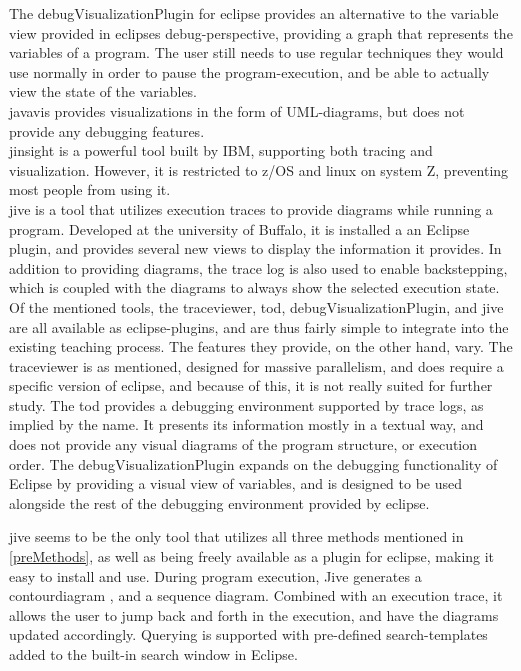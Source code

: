 The \gls{debugVisualizationPlugin} for eclipse provides an alternative to the variable view provided in eclipses debug-perspective, providing a graph that represents the variables of a program.
The user still needs to use regular techniques they would use normally in order to pause the program-execution, and be able to actually view the state of the variables.
~\\

\Gls{javavis} \cite{Oechsle2002} provides visualizations in the form of UML-diagrams, but does not provide any debugging features.
~\\

\Gls{jinsight} \cite{Pauw} is a powerful tool built by IBM, supporting both tracing and visualization.
However, it is restricted to z/OS and linux on system Z, preventing most people from using it.
~\\

\Gls{jive} is a tool that utilizes execution traces to provide diagrams while running a program.
Developed at the university of Buffalo, it is installed a an Eclipse plugin, and provides several new views to display the information it provides.
In addition to providing diagrams, the trace log is also used to enable backstepping, which is coupled with the diagrams to always show the selected execution state.
~\\

Of the mentioned tools, the \gls{traceviewer}, \gls{tod}, \gls{debugVisualizationPlugin}, and \gls{jive} are all available as eclipse-plugins, and are thus fairly simple to integrate into the existing teaching process.
The features they provide, on the other hand, vary.
The \gls{traceviewer} is as mentioned, designed for massive parallelism, and does require a specific version of eclipse, and because of this, it is not really suited for further study.%
The \gls{tod} provides a debugging environment supported by trace logs, as implied by the name.
It presents its information mostly in a textual way, and does not provide any visual diagrams of the program structure, or execution order.
The \gls{debugVisualizationPlugin} expands on the debugging functionality of Eclipse by providing a visual view of variables, and is designed to be used alongside the rest of the debugging environment provided by eclipse.
~\\

\begin{sloppypar}
\Gls{jive} seems to be the only tool that utilizes all three methods mentioned in \autoref{preMethods}, as well as being freely available as a plugin for eclipse, making it easy to install and use.
During program execution, Jive generates a \gls{contourdiagram} \cite{Jayaraman1996}, and a sequence diagram.
Combined with an execution trace, it allows the user to jump back and forth in the execution, and have the diagrams updated accordingly.
Querying is supported with pre-defined search-templates added to the built-in search window in Eclipse.
~\\
\end{sloppypar}

